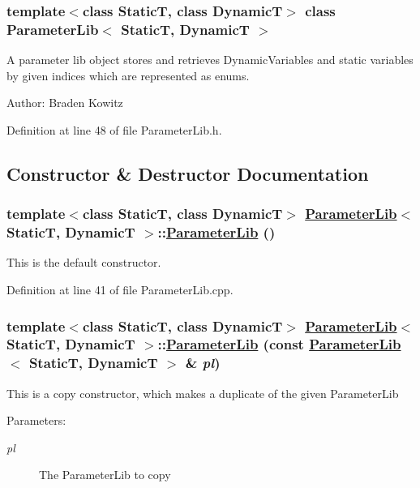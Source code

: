 \subsubsection*{template$<$class Static\-T, class Dynamic\-T$>$ class Parameter\-Lib$<$ Static\-T, Dynamic\-T $>$}

A parameter lib object stores and retrieves Dynamic\-Variables and static variables by given indices which are represented as enums.

\begin{Desc}
\item[Author:]Braden Kowitz \end{Desc}




Definition at line 48 of file Parameter\-Lib.h.

\subsection{Constructor \& Destructor Documentation}
\hypertarget{classParameterLib_a0}{
\subsubsection[ParameterLib]{\setlength{\rightskip}{0pt plus 5cm}template$<$class Static\-T, class Dynamic\-T$>$ \hyperlink{classParameterLib}{Parameter\-Lib}$<$ Static\-T, Dynamic\-T $>$::\hyperlink{classParameterLib}{Parameter\-Lib} ()}}
\label{classParameterLib_a0}


This is the default constructor. 

Definition at line 41 of file Parameter\-Lib.cpp.\hypertarget{classParameterLib_a1}{
\subsubsection[ParameterLib]{\setlength{\rightskip}{0pt plus 5cm}template$<$class Static\-T, class Dynamic\-T$>$ \hyperlink{classParameterLib}{Parameter\-Lib}$<$ Static\-T, Dynamic\-T $>$::\hyperlink{classParameterLib}{Parameter\-Lib} (const \hyperlink{classParameterLib}{Parameter\-Lib}$<$ Static\-T, Dynamic\-T $>$ \& {\em pl})}}
\label{classParameterLib_a1}


This is a copy constructor, which makes a duplicate of the given Parameter\-Lib \begin{Desc}
\item[Parameters:]
\begin{description}
\item[{\em pl}]The Parameter\-Lib to copy \end{description}
\end{Desc}


